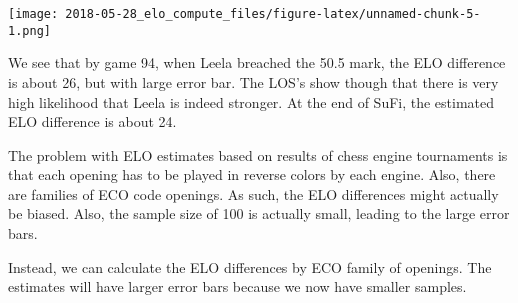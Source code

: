 \documentclass[]{article}
\begin{document}
\texttt{[image: 2018-05-28\_elo\_compute\_files/figure-latex/unnamed-chunk-5-1.png]}

We see that by game 94, when Leela breached the 50.5 mark, the ELO
difference is about 26, but with large error bar. The LOS's show though
that there is very high likelihood that Leela is indeed stronger. At the
end of SuFi, the estimated ELO difference is about 24.

The problem with ELO estimates based on results of chess engine
tournaments is that each opening has to be played in reverse colors by
each engine. Also, there are families of ECO code openings. As such, the
ELO differences might actually be biased. Also, the sample size of 100
is actually small, leading to the large error bars.

Instead, we can calculate the ELO differences by ECO family of openings.
The estimates will have larger error bars because we now have smaller
samples.
\end{document}
